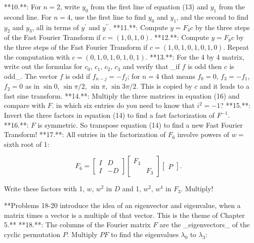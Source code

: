 

**10.**: For \(n=2\), write \(y_{0}\) from the first line of equation (13) and \(y_{1}\) from the second line. For \(n=4\), use the first line to find \(y_{0}\) and \(y_{1}\), and the second to find \(y_{2}\) and \(y_{3}\), all in terms of \(y^{\prime}\) and \(y^{\prime\prime}\).
**11.**: Compute \(y=F_{4}c\) by the three steps of the Fast Fourier Transform if \(c=(1,0,1,0)\).
**12.**: Compute \(y=F_{8}c\) by the three steps of the Fast Fourier Transform if \(c=(1,0,1,0,1,0,1,0)\). Repeat the computation with \(c=(0,1,0,1,0,1,0,1)\).
**13.**: For the 4 by 4 matrix, write out the formulas for \(c_{0}\), \(c_{1}\), \(c_{2}\), \(c_{3}\) and verify that _if \(f\) is odd then \(c\) is odd_. The vector \(f\) is odd if \(f_{n-j}=-f_{j}\); for \(n=4\) that means \(f_{0}=0\), \(f_{3}=-f_{1}\), \(f_{2}=0\) as in \(\sin 0\), \(\sin\pi/2\), \(\sin\pi\), \(\sin 3\pi/2\). This is copied by \(c\) and it leads to a fast sine transform.
**14.**: Multiply the three matrices in equation (16) and compare with \(F\). in which six entries do you need to know that \(i^{2}=-1\)?
**15.**: Invert the three factors in equation (14) to find a fast factorization of \(F^{-1}\).
**16.**: \(F\) is symmetric. So transpose equation (14) to find a new Fast Fourier Transform!
**17.**: All entries in the factorization of \(F_{6}\) involve powers of \(w=\) sixth root of 1:

\[F_{6}=\begin{bmatrix}I&D\\ I&-D\end{bmatrix}\begin{bmatrix}F_{3}\\ &F_{3}\end{bmatrix}\begin{bmatrix}P\end{bmatrix}.\]

Write these factors with 1, \(w\), \(w^{2}\) in \(D\) and 1, \(w^{2}\), \(w^{4}\) in \(F_{3}\). Multiply!

**Problems 18-20 introduce the idea of an eigenvector and eigenvalue, when a matrix times a vector is a multiple of that vector. This is the theme of Chapter 5.**
**18.**: The columns of the Fourier matrix \(F\) are the _eigenvectors_ of the cyclic permutation \(P\). Multiply \(PF\) to find the eigenvalues \(\lambda_{0}\) to \(\lambda_{3}\):

